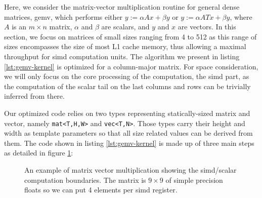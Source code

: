 \documentclass[../main]{subfiles}
\begin{document}
Here, we consider the matrix-vector multiplication routine
for general dense matrices, \gls{gemv}, which performs either
$y := \alpha A x + \beta y$ or $y := \alpha A T x + \beta y$,
where $A$ is an $m \times n$ matrix, $\alpha$ and $\beta$ are scalars,
and $y$ and $x$ are vectors. In this section,
we focus on matrices of small sizes ranging from
4 to 512 as this range of sizes encompasses the size of
most L1 cache memory, thus allowing a maximal throughput
for \gls{simd} computation units. The algorithm we present in
listing \ref{lst:gemv-kernel} is optimized for a column-major matrix.
For space consideration, we will only focus on the core processing of
the computation, \ie the \gls{simd} part, as the computation of
the scalar tail on the last columns and rows can be trivially
inferred from there.

Our optimized code relies on two types representing
statically-sized matrix and vector, namely \lstinline{mat<T,H,W>}
and \lstinline{vec<T,N>}. Those types carry their height and width
as template parameters so that all size related values can be
derived from them. The code shown in listing \ref{lst:gemv-kernel} is made up
of three main steps as detailed in figure \ref{fig:simd-gemv-illustration}:

\begin{figure}[h]
\fontsize{8}{10}\selectfont

\caption{
  An example of matrix vector multiplication showing the \gls{simd}/scalar
  computation boundaries. The matrix is $9 \times 9$ of simple precision floats
  so we can put 4 elements per \gls{simd} register.
}
\label{fig:simd-gemv-illustration}
\end{figure}
\end{document}
